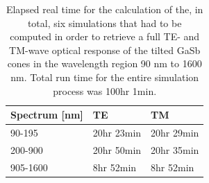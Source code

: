 \begin{table}[htb]
    \centering
    \caption{Elapsed real time for the calculation of the, in total, six simulations that had to be computed in order to retrieve a full TE- and TM-wave optical response of the tilted GaSb cones in the wavelength region 90 nm to 1600 nm. Total run time for the entire simulation process was 100hr 1min.}
    \label{tab:gasb_computationtimes}
    \begin{tabular}{l l l}
    Spectrum [nm]    &   TE  &   TM    \\    \hline
    90-195  &   20hr 23min  &   20hr 29min\\
    200-900 &   20hr 50min  &   20hr 35min\\
    905-1600    &   8hr 52min   &   8hr 52min   \\  \hline
    \end{tabular}
\end{table}

